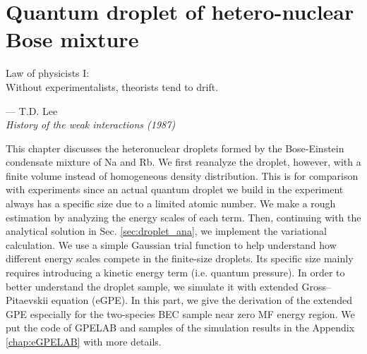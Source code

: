 \chapter{Quantum droplet of hetero-nuclear Bose mixture}
\label{Chap_droplet}

\setlength{\unitlength}{1pt}
\setlength{\epigraphwidth}{10cm}
\epigraph{Law of physicists I: \\ Without experimentalists, theorists tend to drift. \cite{Lee:1992ui}}{--- T.D. Lee\\ \textit{History of the weak interactions (1987)}}

This chapter discusses the heteronuclear droplets formed by the Bose-Einstein condensate mixture of Na and Rb. We first reanalyze the droplet, however, with a finite volume instead of homogeneous density distribution. This is for comparison with experiments since an actual quantum droplet we build in the experiment always has a specific size due to a limited atomic number. We make a rough estimation by analyzing the energy scales of each term. Then, continuing with the analytical solution in Sec. \ref{sec:droplet_ana}, we implement the variational calculation. We use a simple Gaussian trial function to help understand how different energy scales compete in the finite-size droplets. Its specific size mainly requires introducing a kinetic energy term (i.e. quantum pressure). In order to better understand the droplet sample, we simulate it with extended Gross–Pitaevskii equation (eGPE). In this part, we give the derivation of the extended GPE especially for the two-species BEC sample near zero MF energy region. We put the code of GPELAB \cite{ANTOINE20142969} and samples of the simulation results in the Appendix \ref{chap:eGPELAB} with more details.

